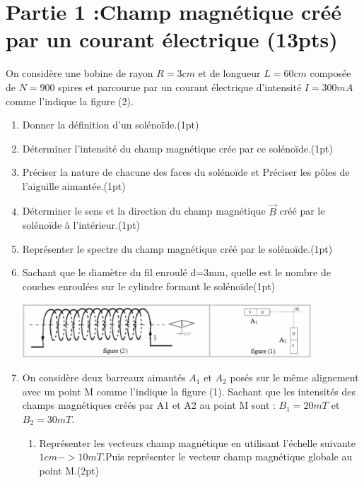 \documentclass[12pt]{article}
\begin{document}
 \section*{Partie 1 :Champ magnétique créé par un courant électrique  \dotfill(13pts)}

  On considère une bobine de rayon $R=3cm$ et de longueur $L=60cm$ composée de $N=900$ spires et parcourue par un courant électrique d'intensité $I=300mA$ comme l'indique la figure (2).

\begin{enumerate}
   \item Donner la définition d'un solénoïde.\dotfill(1pt)

   \item  Déterminer l'intensité du champ magnétique crée par ce solénoïde.\dotfill(1pt)

   \item Préciser la nature de chacune des faces du solénoïde et Préciser les pôles de l'aiguille aimantée.\dotfill(1pt)

   \item  Déterminer le sens et la direction du champ magnétique $\vec{B}$ créé par le solénoïde à l'intérieur.\dotfill(1pt)

  \item Représenter le spectre du champ magnétique créé par le solénoïde.\dotfill(1pt)

  \item Sachant que le diamètre du fil enroulé d=3mm, quelle est le nombre de couches enroulées sur le cylindre formant le solénoïde\dotfill(1pt)
  \begin{center}
     \includegraphics[width=0.85\textwidth]{./img/Exo__sol.png}
  \end{center}

\item On considère deux barreaux aimantés $A_1$ et $A_2$ posés sur le même alignement avec un point M comme l'indique la
figure (1). Sachant que les intensités des champs magnétiques créés par A1 et A2 au point M sont : $B_1=20mT$ et $B_2=30mT$.
    \begin{enumerate}

      \item Représenter les vecteurs champ magnétique en utilisant l'échelle suivante $1cm ->10mT$.Puis représenter le vecteur champ magnétique globale au point M.\dotfill(2pt)


\end{enumerate}
\end{enumerate}
\end{document}
